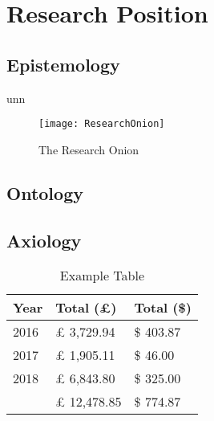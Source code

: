 \section{Research Position}
\lipsum[1]
\subsection{Epistemology}
\gls{unn}  \lipsum[1] 

\begin{figure}[ht]
    \centering
    \texttt{[image: ResearchOnion]}
    \caption{The Research Onion}
    \label{fig:research-onion}
\end{figure}

\subsection{Ontology}
\lipsum[1]
\subsection{Axiology}
\lipsum[1]
\begin{table}[]
\begin{center}

\begin{tabular}{|l|l|l|}
\hline
Year & Total (£)   & Total (\$) \\ \hline
2016 & £ 3,729.94  & \$ 403.87  \\ \hline
2017 & £ 1,905.11  & \$ 46.00   \\ \hline
2018 & £ 6,843.80  & \$ 325.00  \\ \hline
     & £ 12,478.85 & \$ 774.87  \\ \hline
\end{tabular}
\caption{Example Table}
\label{table:Example Table}
\end{center}
\end{table}